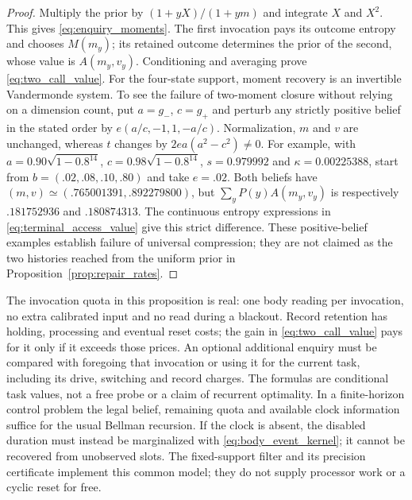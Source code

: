 \documentclass[12pt]{article}
\theoremstyle{definition}
\begin{document}
\begin{proof}
Multiply the prior by $(1+yX)/(1+ym)$ and integrate $X$ and $X^2$.
This gives \eqref{eq:enquiry_moments}. The first invocation pays
its outcome entropy and chooses $M(m_y)$; its retained outcome
determines the prior of the second, whose value is $A(m_y,v_y)$.
Conditioning and averaging prove \eqref{eq:two_call_value}.
For the four-state support, moment recovery is an invertible
Vandermonde system. To see the failure of two-moment closure
without relying on a dimension count, put $a=g_-$, $c=g_+$ and
perturb any strictly positive belief in the stated order by
$e(a/c,-1,1,-a/c)$. Normalization, $m$ and $v$ are unchanged,
whereas $t$ changes by $2ea(a^2-c^2)\ne0$. For example, with
$a=0.90\sqrt{1-0.8^{14}}$, $c=0.98\sqrt{1-0.8^{14}}$,
$s=0.979992$ and $\kappa=0.00225388$, start from
$b=(.02,.08,.10,.80)$ and take $e=.02$.
Both beliefs have $(m,v)\simeq(.765001391,.892279800)$,
but $\sum_yP(y)A(m_y,v_y)$ is respectively
$.181752936$ and $.180874313$. The continuous entropy expressions
in \eqref{eq:terminal_access_value} give this strict difference.
These positive-belief examples establish failure of universal
compression; they are not claimed as the two histories reached
from the uniform prior in Proposition~\ref{prop:repair_rates}.
\end{proof}

The invocation quota in this proposition is real: one body reading
per invocation, no extra calibrated input and no read during a
blackout. Record retention has holding, processing and eventual
reset costs; the gain in \eqref{eq:two_call_value} pays for it
only if it exceeds those prices. An optional additional enquiry
must be compared with foregoing that invocation or using it for
the current task, including its drive, switching and record
charges. The formulas are conditional task values, not a free
probe or a claim of recurrent optimality. In a finite-horizon
control problem the legal belief, remaining quota and available
clock information suffice for the usual Bellman recursion.
If the clock is absent, the disabled duration must instead be
marginalized with \eqref{eq:body_event_kernel}; it cannot be
recovered from unobserved slots. The fixed-support filter and its
precision certificate implement this common model; they do not
supply processor work or a cyclic reset for free.
\end{document}
